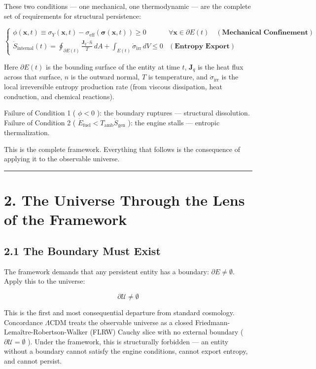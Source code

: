 \documentclass[11pt,a4paper]{article}
\theoremstyle{definition}\newtheorem{definition}{Definition}
\theoremstyle{remark}\newtheorem{remark}{Remark}
\begin{document}
These two conditions — one mechanical, one thermodynamic — are the complete set of requirements for structural persistence:


\begin{equation}
\boxed{\begin{cases}
\phi(\mathbf{x}, t) \equiv \sigma_Y(\mathbf{x}, t) - \sigma_{\text{eff}}(\boldsymbol{\sigma}(\mathbf{x}, t)) \ge 0 & \forall \mathbf{x} \in \partial E(t) \quad (\textbf{Mechanical Confinement}) \\[8pt]
\dot{S}_{\text{internal}}(t) = \oint_{\partial E(t)} \frac{\mathbf{J}_q \cdot \hat{n}}{T} \, dA + \int_{E(t)} \dot{\sigma}_{\text{irr}} \, dV \le 0 & (\textbf{Entropy Export})
\end{cases}}
\end{equation}


Here $\partial E(t)$ is the bounding surface of the entity at time $t$, $\mathbf{J}_q$ is the heat flux across that surface, $\hat{n}$ is the outward normal, $T$ is temperature, and $\dot{\sigma}_{\text{irr}}$ is the local irreversible entropy production rate (from viscous dissipation, heat conduction, and chemical reactions).

Failure of Condition 1 ( $\phi < 0$ ): the boundary ruptures — structural dissolution.  
Failure of Condition 2 ( $\dot{E}_{\text{fuel}} < T_{\text{amb}}\dot{S}_{\text{gen}}$ ): the engine stalls — entropic thermalization.

This is the complete framework. Everything that follows is the consequence of applying it to the observable universe.

\noindent\rule{\linewidth}{0.4pt}
\section{2. The Universe Through the Lens of the Framework}
\subsection{2.1 The Boundary Must Exist}

The framework demands that any persistent entity has a boundary: $\partial E \neq \emptyset$. Apply this to the universe:


\begin{equation}
\partial\mathcal{U} \neq \emptyset
\end{equation}


This is the first and most consequential departure from standard cosmology. Concordance $\Lambda\text{CDM}$ treats the observable universe as a closed Friedmann-Lemaître-Robertson-Walker (FLRW) Cauchy slice with no external boundary ( $\partial\mathcal{U} = \emptyset$ ). Under the framework, this is structurally forbidden — an entity without a boundary cannot satisfy the engine conditions, cannot export entropy, and cannot persist.
\end{document}

